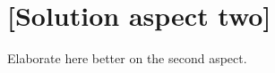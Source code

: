 \chapter{[Solution aspect two]}
\label{capitolo6}
\thispagestyle{empty}

Elaborate here better on the second aspect.